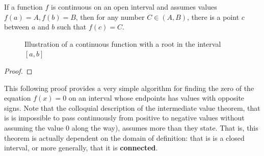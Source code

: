     \begin{theorem}
      If a function $f$ is continuous on an open interval and assumes values $f(a) = A, f(b) = B$, then for any number $C \in (A, B)$, there is a point $c$ between $a$ and $b$ such that $f(c) = C$. 

      \begin{figure}[H]
        \centering 
        \caption{Illustration of a continuous function with a root in the interval $[a,b]$}
        \label{fig:continuous-function-root}
      \end{figure}
    \end{theorem}
    \begin{proof}

    \end{proof}

    This following proof provides a very simple algorithm for finding the zero of the equation $f(x) = 0$ on an interval whose endpoints has values with opposite signs. 
    Note that the colloquial description of the intermediate value theorem, that is is impossible to pass continuously from positive to negative values without assuming the value $0$ along the way), assumes more than they state. That is, this theorem is actually dependent on the domain of definition: that is is a closed interval, or more generally, that it is \textbf{connected}. 


